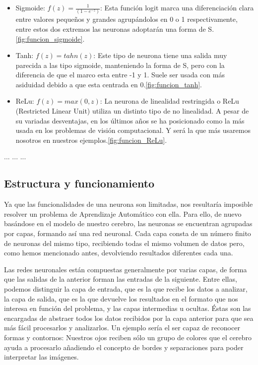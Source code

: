 \begin{itemize}
    \item Sigmoide: $f(z) = \frac{1}{(1-e^{-z})}$: Esta función logit marca una diferenciación clara entre valores pequeños y grandes agrupándolos en 0 o 1 respectivamente, entre estos dos extremos las neuronas adoptarán una forma de S.\ref{fig:funcion_sigmoide}.
    \item Tanh: $f(z)= tahn(z)$: Este tipo de neurona tiene una salida muy parecida a las tipo sigmoide, manteniendo la forma de S, pero con la diferencia de que el marco esta entre -1 y 1. Suele ser usada con más asiduidad debido a que esta centrada en 0.\ref{fig:funcion_tanh}.
    \item ReLu: $f(z) = max(0,z)$: La neurona de linealidad restringida o ReLu (Restricted Linear Unit) utiliza un distinto tipo de no linealidad. A pesar de su variadas desventajas, en los últimos años se ha posicionado como la más usada en los problemas de visión computacional. Y será la que más usaremos nosotros en nuestros ejemplos.\ref{fig:funcion_ReLu}.
\end{itemize}

%
       {...}
%
       {...}
%
       {...}

\subsection{Estructura y funcionamiento}
Ya que las funcionalidades de una neurona son limitadas, nos resultaría imposible resolver un problema de Aprendizaje Automático con ella. Para ello, de nuevo basándose en el modelo de nuestro cerebro, las neuronas se encuentran agrupadas por capas, formando así una red neuronal. Cada capa consta de un número finito de neuronas del mismo tipo, recibiendo todas el mismo volumen de datos pero, como hemos mencionado antes, devolviendo resultados diferentes cada una.

Las redes neuronales están compuestas generalmente por varias capas, de forma que las salidas de la anterior forman las entradas de la siguiente. Entre ellas, podemos distinguir la capa de entrada, que es la que recibe los datos a analizar, la capa de salida, que es la que devuelve los resultados en el formato que nos interesa en función del problema, y las capas intermedias u ocultas. Éstas son las encargadas de abstraer todos los datos recibidos por la capa anterior para que sea más fácil procesarlos y analizarlos. Un ejemplo sería el ser capaz de reconocer formas y contornos: Nuestros ojos reciben sólo un grupo de colores que el cerebro ayuda a procesarlo añadiendo el concepto de bordes y separaciones para poder interpretar las imágenes.

